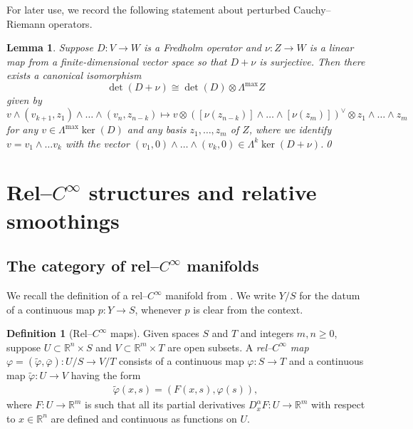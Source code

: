 \documentclass[11pt,psamsfonts, oneside, reqno]{amsart}
\newcommand{\cl}{\colon}
\newcommand{\dul}{^\vee}
\newcommand{\bR}{\mathbb{R}}
\newcommand{\topw}{\Lambda^{\max}}
\newtheorem{lemma}[theorem]{Lemma}
\theoremstyle{definition}
\newtheorem{definition}[theorem]{Definition}
\theoremstyle{remark}
\numberwithin{equation}{section}
\begin{document}
\noindent
For later use, we record the following statement about perturbed Cauchy--Riemann operators. 

\begin{lemma}\cite[Lemma~3.2]{Bao23}\label{lem:orientation-of-sum} Suppose $D\cl V\to W$ is a Fredholm operator and $\nu \cl Z\to W$ is a linear map from a finite-dimensional vector space so that  $D+\nu$ is surjective. Then there exists a canonical isomorphism 
	$$\det(D+\nu) \cong \det(D)\otimes \topw Z$$\noindent
	given by 
	$$v\wedge (v_{k+1},z_1)\wedge \dots \wedge (v_n,z_{n-k})\mapsto v\otimes ([\nu(z_{n-k})]\wedge \dots \wedge[\nu(z_m)])\dul \otimes z_1\wedge \dots \wedge z_m$$\noindent
	for any $v \in\topw\ker(D)$ and any basis $z_1,\dots,z_m$ of $Z$, where we identify $v  =v_1 \wedge \dots v_k$ with the vector $(v_1,0)\wedge \dots \wedge (v_k,0)\in \Lambda^k\ker(D+\nu)$.\qed
\end{lemma}



\section{Rel--$C^\infty$ structures and relative smoothings}\label{sec:rel-smooth-forms}

\subsection{The category of rel--$C^\infty$ manifolds}\label{subsec:rel-smooth-manifolds} We recall the definition of a rel--$C^\infty$ manifold from \cite{Swa21}. We write $Y/S$ for the datum of a continuous map $p\cl Y\to S$, whenever $p$ is clear from the context.


\begin{definition}[Rel--$C^\infty$ maps]
	Given spaces $S$ and $T$ and integers $m,n\ge 0$, suppose $U\subset\bR^n\times S$ and $V\subset\bR^m\times T$ are open subsets. A \emph{rel--$C^\infty$ map} $\varphi = (\tilde\varphi,\bar{\varphi})\cl U/S\to V/T$ consists of a continuous map $\varphi\cl S\to T$ and a continuous map $\tilde\varphi\cl U\to V$ having the form
	\begin{align*}
		\tilde\varphi(x,s) = (F(x,s),\varphi(s)),
	\end{align*}
	where $F\cl U\to\bR^m$ is such that all its partial derivatives $D^\alpha_xF\cl U\to\bR^m$ with respect to $x\in\bR^n$ are defined and continuous as functions on $U$.
\end{definition}
\end{document}
